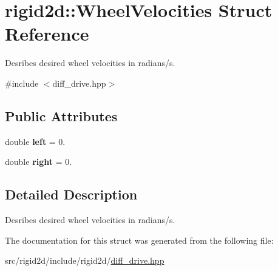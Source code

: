 \hypertarget{structrigid2d_1_1WheelVelocities}{}\section{rigid2d\+:\+:Wheel\+Velocities Struct Reference}
\label{structrigid2d_1_1WheelVelocities}


Desribes desired wheel velocities in radians/s.  




{\ttfamily \#include $<$diff\+\_\+drive.\+hpp$>$}

\subsection*{Public Attributes}
\begin{DoxyCompactItemize}
\item 
\mbox{\label{structrigid2d_1_1WheelVelocities_ae45d650d32f57530dddef635e0101ff7}} 
double {\bfseries left} = 0.
\item 
\mbox{\label{structrigid2d_1_1WheelVelocities_a46faa21bece779a405339e5a51e4a618}} 
double {\bfseries right} = 0.
\end{DoxyCompactItemize}


\subsection{Detailed Description}
Desribes desired wheel velocities in radians/s. 

The documentation for this struct was generated from the following file\+:\begin{DoxyCompactItemize}
\item 
src/rigid2d/include/rigid2d/\hyperlink{diff__drive_8hpp}{diff\+\_\+drive.\+hpp}\end{DoxyCompactItemize}
